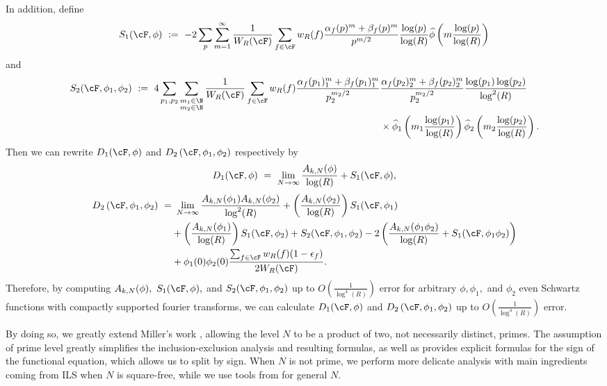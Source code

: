 \documentclass[11pt, reqno]{amsart}
\theoremstyle{definition}
\theoremstyle{remark}
\numberwithin{equation}{section}
\renewcommand{\hat}{\widehat}
\begin{document}
In addition, define \begin{equation}
    S_1(\cF,\phi)\ := \ -2\sum_{p}\sum_{m=1}^\infty\frac{1}{W_R(\cF)}\sum_{f\in\cF} w_R(f) \frac{\alpha_f(p)^m+\beta_f(p)^m}{p^{m/2}}\frac{\log(p)}{\log(R)}\hat\phi\left(m\frac{\log(p)}{\log(R)}\right)
\end{equation} and
\footnotesize \begin{align}
    S_2(\cF,\phi_1,\phi_2)\notag\ := \ 4\sum_{p_1,p_2}\sum_{\substack{m_1\in\N \\ m_2\in\N}} \frac{1}{W_R(\cF)}\sum_{f\in\cF} w_R(f) \frac{\alpha_f(p_1)^m_1+\beta_f(p_1)^m_1}{p_2^{m_2/2}}&\frac{\alpha_f(p_2)^m_2+\beta_f(p_2)^m_2}{p_2^{m_2/2}}\frac{\log(p_1)\log(p_2)}{\log^2(R)}\\&\times\hat\phi_1\left(m_1\frac{\log(p_1)}{\log(R)}\right)\hat\phi_2\left(m_2\frac{\log(p_2)}{\log(R)}\right).
\end{align}\normalsize
Then we can rewrite $D_1(\cF,\phi)$ and $D_2\left(\cF, \phi_1,\phi_2\right)$ respectively by
\begin{equation}
    D_1(\cF,\phi) \ = \ \lim_{N\to \infty}\frac{A_{k,N}(\phi)}{\log(R)} + S_1(\cF,\phi),
\end{equation}
\begin{align}
  D_2\left(\cF, \phi_1,\phi_2\right) \ =& \  \lim_{N\to \infty}\frac{A_{k,N}(\phi_1)A_{k,N}(\phi_2)}{\log^2(R)} +\left(\frac{A_{k,N}(\phi_{2})}{\log(R)}\right)S_1(\cF,\phi_1) \\\ &+\left(\frac{A_{k,N}(\phi_{1})}{\log(R)}\right)S_1(\cF,\phi_2)+S_2(\cF,\phi_1,\phi_2) \notag- 2\left(\frac{A_{k,N}(\phi_1\phi_2)}{\log(R)} + S_1(\cF,\phi_1\phi_2)\right)  \\ \ &+\phi_1(0)\phi_2(0)\frac{\sum_{f\in\cF}w_R(f)(1-\epsilon_f)}{2W_R(\cF)}. 
\end{align}
Therefore, by computing $A_{k,N}(\phi), ~ S_1(\cF,\phi),$ and $S_2(\cF,\phi_1,\phi_2)$ up to $O\left(\frac{1}{\log^4(R)}\right)$ error for arbitrary $\phi,\phi_1,$ and $\phi_2$ even Schwartz functions with compactly supported fourier transforms, we can calculate    $D_1(\cF,\phi)$ and $D_2\left(\cF,\phi_1,\phi_2\right)$ up to $O\left(\frac{1}{\log^4(R) }\right)$ error. 


By doing so, we greatly extend Miller's work \cite{Miller2009_LOTerms_1LevelDensity}, allowing the level $N$ to be a product of two, not necessarily distinct, primes. The assumption of prime level greatly simplifies the inclusion-exclusion analysis and resulting formulas, as well as provides explicit formulas for the sign of the functional equation, which allows us to split by sign. When $N$ is not prime, we perform more delicate analysis with main ingredients coming from ILS \cite{ILS2} when $N$ is square-free, while we use tools from \cite{BarrettEtAl2016arXiv} for general $N$.
\end{document}

